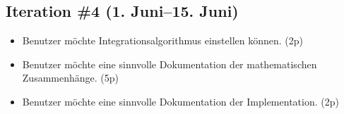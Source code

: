 \documentclass[11pt]{report} %
\theoremstyle{definition}
\begin{document}
\begin{appendix}
\section{Iteration \#4 (1. Juni--15. Juni)}

\begin{itemize}
\item Benutzer möchte Integrationsalgorithmus einstellen können. (2p) 
\item Benutzer möchte eine sinnvolle Dokumentation der mathematischen Zusammenhänge. (5p)
\item Benutzer möchte eine sinnvolle Dokumentation der Implementation. (2p)
\end{itemize}

\end{appendix}
\end{document}
